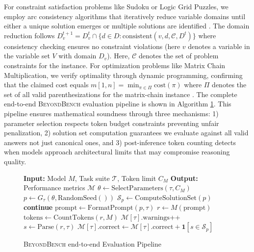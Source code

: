 \documentclass{article} %
\theoremstyle{plain}
\theoremstyle{definition}
\newcommand{\our}{\textsc{BeyondBench}\xspace}
\newcommand{\ah}[1]{{\small\color{blue}{\bf ah:} #1}}
\begin{document}


For constraint satisfaction problems like Sudoku or Logic Grid Puzzles, we employ arc consistency algorithms that iteratively reduce variable domains until either a unique solution emerges or multiple solutions are identified \citep{simonis2005sudoku, howell2018solving}. The domain reduction follows $D_v^{t+1} = D_v^t \cap \{d \in D : \text{consistent}(v, d, \mathcal{C}, D^t)\}$ where consistency checking ensures no constraint violations (here \(v\) denotes a variable in the variable set \(V\) with domain \(D_v\)). Here, $\mathcal{C}$ denotes the set of problem constraints for the instance. For optimization problems like Matrix Chain Multiplication, we verify optimality through dynamic programming, confirming that the claimed cost equals $m[1,n] = \min_{\pi \in \Pi} \text{cost}(\pi)$ where \(\Pi\) denotes the set of all valid parenthesizations for the matrix-chain instance \citep{carbonnel2019singleton, cooper2001arcconsistencysoftconstraints, Cooper_2017}. The complete end-to-end \our evaluation pipeline is shown in Algorithm \ref{alg1}. This pipeline ensures mathematical soundness through three mechanisms: 1) parameter selection respects token budget constraints preventing unfair penalization, 2) solution set computation guarantees we evaluate against all valid answers not just canonical ones, and 3) post-inference token counting detects when models approach architectural limits that may compromise reasoning quality.

\begin{figure} %
  \centering
  \vspace{-2em}
  \begin{minipage}{0.50\textwidth}
    \small
    \begin{algorithm}[H]
\caption{\our end-to-end Evaluation Pipeline}
\label{alg1}
    \begin{algorithmic}[1]
      \State \textbf{Input:} Model $M$, Task suite $\mathcal{T}$, Token limit $C_M$
      \State \textbf{Output:} Performance metrics $\mathcal{M}$
        \State $\theta \gets \text{SelectParameters}(\tau, C_M)$
        \State $p \gets G_\tau(\theta, \text{RandomSeed}())$
        \State $\mathcal{S}_p \gets \text{ComputeSolutionSet}(p)$
         \State \textbf{continue} \EndIf
        \State $\text{prompt} \gets \text{FormatPrompt}(p, \tau)$
        \State $r \gets M(\text{prompt})$
        \State $\text{tokens} \gets \text{CountTokens}(r, M)$
         \State $\mathcal{M}[\tau].\text{warnings}$++ \EndIf
        \State $s \gets \text{Parse}(r, \tau)$
        \State $\mathcal{M}[\tau].\text{correct} \gets \mathcal{M}[\tau].\text{correct} + \mathbf{1}[s \in \mathcal{S}_p]$
      \EndFor
    \end{algorithmic}
    \end{algorithm}
  \end{minipage}
  \vspace{-2em}
\end{figure}
\end{document}
